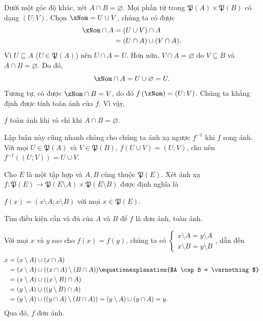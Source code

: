 Dưới một góc độ khác, xét $A \cap B = \varnothing$. Mọi phần tử trong $\mathfrak{P}(A) \times \mathfrak{P}(B)$ có dạng $(U; V)$. Chọn $\xNom = U \cup V$, chúng ta có được \begin{align*}
   \xNom \cap A &= (U \cup V) \cap A \\
      &= (U \cap A) \cup (V \cap A).
\end{align*}
Vì $U \subseteq A$ ($U \in \mathfrak{P}(A)$) nên $U \cap A = U$. Hơn nữa, $V \cap A = \varnothing$ do $V \subseteq B$ và $A \cap B = \varnothing$. Do đó, \begin{equation*}
   \xNom \cap A = U \cup \varnothing = U.
\end{equation*}
Tương tự, có được $\xNom \cap B = V$, do đó $f\left(\xNom\right) = (U; V)$. Chúng ta khẳng định được tính toàn ánh của $f$. Vì vậy,
\begin{center}
   $f$ toàn ánh khi và chỉ khi $A \cap B = \varnothing$.
\end{center}
Lập luận này cũng nhanh chóng cho chúng ta ánh xạ ngược $f^{-1}$ khi $f$ song ánh. Với mọi $U \in \mathfrak{P}(A)$ và $V \in \mathfrak{P}(B)$, $f(U \cup V) = (U; V)$, cho nên $f^{-1}((U; V)) = U \cup V$. 

\exercise Cho $E$ là một tập hợp và $A, B$ cùng thuộc $\mathfrak{P}(E)$. Xét ánh xạ $f: \mathfrak{P}(E) \to \mathfrak{P}(E \setminus A) \times \mathfrak{P}(E \setminus B)$ được định nghĩa là \begin{center}
   $f(x) = (x \setminus A; x \setminus B)$ với mọi $x \in \mathfrak{P}(E)$.
\end{center}
Tìm điều kiện cần và đủ của $A$ và $B$ để $f$ là đơn ánh, toàn ánh.

\solution

Với mọi $x$ và $y$ sao cho $f(x) = f(y)$, chúng ta có $\begin{cases}
   x \setminus A = y \setminus A \\
   x \setminus B = y \setminus B
\end{cases}$, dẫn đến \begin{align*}
   x &= (x \setminus A) \cup (x \cap A) \\
   &= (x \setminus A) \cup ((x \cap A) \setminus (B \cap A)) \equationexplanation{$A \cap B = \varnothing$}\\
   &= (x \setminus A) \cup ((x \setminus B) \cap A) \\
   &= (y \setminus A) \cup ((y \setminus B) \cap A) \\
   &= (y \setminus A) \cup ((y \cap A) \setminus (B \cap A)) = (y \setminus A) \cup (y \cap A) = y.
\end{align*}
Qua đó, $f$ đơn ánh.

